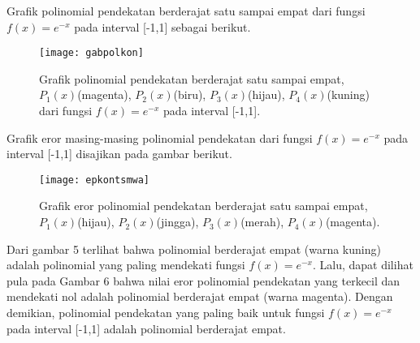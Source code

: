 \documentclass[a4paper,12pt]{article}
\begin{document}
\begin{enumerate}
\begin{table}[H]
\begin{center}
\begin{tabular}{|p{3mm}|p{120mm}|}
			\hline
			\end{tabular}
		\end{center}
	\end{table}
	Grafik polinomial pendekatan berderajat satu sampai empat dari fungsi $f(x) = e^{-x} $ pada interval [-1,1] sebagai berikut.
\begin{figure}[H]
	\begin{center}
	\texttt{[image: gabpolkon]}
	\end{center}
	\begin{center}
	\caption{Grafik polinomial pendekatan berderajat satu sampai empat, $P_1(x)$(magenta), $P_2(x)$(biru), $P_3(x)$(hijau), $P_4(x)$(kuning) dari fungsi $f(x) = e^{-x} $ pada interval [-1,1].}
	\end{center}
	\end{figure}
Grafik eror masing-masing polinomial pendekatan dari fungsi 
$f(x) = e^{-x} $ pada interval [-1,1] disajikan pada gambar berikut.
\begin{figure}[H]
	\begin{center}
		\texttt{[image: epkontsmwa]}
	\end{center}
	\begin{center}
		\caption{Grafik eror polinomial pendekatan berderajat satu sampai empat, $P_1(x)$(hijau), $P_2(x)$(jingga), $P_3(x)$(merah), $P_4(x)$(magenta).}
	\end{center}
\end{figure}
\pagebreak
	Dari gambar 5  terlihat bahwa polinomial berderajat empat (warna kuning) adalah polinomial yang paling mendekati fungsi $f(x)=e^{-x}$. Lalu, dapat dilihat pula pada Gambar 6 bahwa nilai eror polinomial pendekatan yang terkecil dan mendekati nol adalah polinomial berderajat empat (warna magenta). Dengan demikian, polinomial pendekatan yang paling baik untuk fungsi $f(x)=e^{-x}$ pada interval [-1,1] adalah polinomial berderajat empat.
\end{enumerate}	
\end{document}
